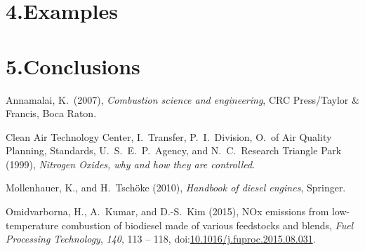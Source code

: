\documentclass[9pt]{report}
\begin{document}
\section{4.\hspace*{0.5em}Examples}\label{sec-examples}%

\section{5.\hspace*{0.5em}Conclusions}\label{sec-conclusions}%

{\mdsupressbiblabel{}\begin{thebibliography}{4}%
\label{sec-bibliography}%

\mdbibitemlabel{}Annamalai, K.~(2007), \emph{Combustion science and engineering}, CRC Press/Taylor \& Francis, Boca Raton.\label{annamalai2007combustion}%

\mdbibitemlabel{}Clean Air Technology Center, I.~Transfer, P.~I.~Division, O.~of Air Quality Planning, Standards, U.~S.~E.~P.~Agency, and N.~C.~Research Triangle Park (1999), \emph{Nitrogen Oxides, why and how they are controlled}.\label{epabulletin}%

\mdbibitemlabel{}Mollenhauer, K., and H.~Tschöke (2010), \emph{Handbook of diesel engines}, Springer.\label{mollenhauer2010handbook}%

\mdbibitemlabel{}Omidvarborna, H., A.~Kumar, and D.-S.~Kim (2015), NOx emissions from low-temperature combustion of biodiesel made of various feedstocks and blends, \emph{Fuel Processing Technology}, \emph{140}, 113 – 118, doi:\href{https://dx.doi.org/10.1016/j.fuproc.2015.08.031}{10.1016/j.fuproc.2015.08.031}.\label{omidvarborna2015113}%
\par%
\end{thebibliography}}%
\end{document}
